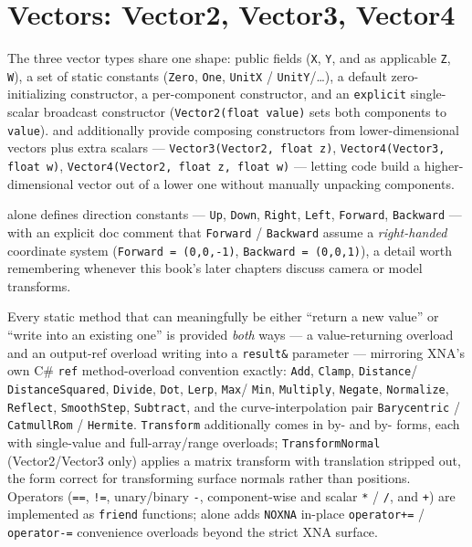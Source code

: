 \section{Vectors: Vector2, Vector3, Vector4}

The three vector types share one shape: public fields (\texttt{X}, \texttt{Y}, and as
applicable \texttt{Z}, \texttt{W}), a set of static constants (\texttt{Zero}, \texttt{One},
\texttt{UnitX} / \texttt{UnitY}/\ldots), a default zero-initializing constructor, a per-component
constructor, and an \texttt{explicit} single-scalar broadcast constructor
(\texttt{Vector2(float value)} sets both components to \texttt{value}).  and
 additionally provide composing constructors from lower-dimensional vectors
plus extra scalars --- \texttt{Vector3(Vector2, float z)}, \texttt{Vector4(Vector3, float w)},
\texttt{Vector4(Vector2, float z, float w)} --- letting code build a higher-dimensional
vector out of a lower one without manually unpacking components.

 alone defines direction constants --- \texttt{Up}, \texttt{Down},
\texttt{Right}, \texttt{Left}, \texttt{Forward}, \texttt{Backward} --- with an explicit doc
comment that \texttt{Forward} / \texttt{Backward} assume a \emph{right-handed} coordinate
system (\texttt{Forward = (0,0,-1)}, \texttt{Backward = (0,0,1)}), a detail worth remembering
whenever this book's later chapters discuss camera or model transforms.

Every static method that can meaningfully be either ``return a new value'' or ``write into an
existing one'' is provided \emph{both} ways --- a value-returning overload and an output-ref
overload writing into a \texttt{result\&} parameter --- mirroring XNA's own C\# \texttt{ref}
method-overload convention exactly: \texttt{Add}, \texttt{Clamp}, \texttt{Distance}/%
\texttt{DistanceSquared}, \texttt{Divide}, \texttt{Dot}, \texttt{Lerp}, \texttt{Max}/%
\texttt{Min}, \texttt{Multiply}, \texttt{Negate}, \texttt{Normalize}, \texttt{Reflect},
\texttt{SmoothStep}, \texttt{Subtract}, and the curve-interpolation pair
\texttt{Barycentric} / \texttt{CatmullRom} / \texttt{Hermite}. \texttt{Transform} additionally
comes in by- and by- forms, each with single-value and
full-array/range overloads; \texttt{TransformNormal} (Vector2/Vector3 only) applies a matrix
transform with translation stripped out, the form correct for transforming surface normals
rather than positions. Operators (\texttt{==}, \texttt{!=}, unary/binary \texttt{-},
component-wise and scalar \texttt{*} / \texttt{/}, and \texttt{+}) are implemented as
\texttt{friend} functions;  alone adds \texttt{NOXNA} in-place
\texttt{operator+=} / \texttt{operator-=} convenience overloads beyond the strict XNA surface.

